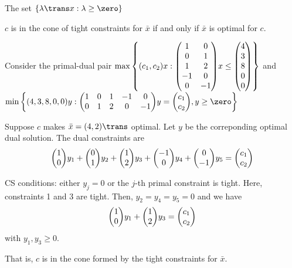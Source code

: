 \begin{defn*}
  The set $\{\lambda\trans x : \lambda \geq \zero\}$
\end{defn*}

\begin{lemma}
  $c$ is in the cone of tight constraints for $\bar x$
  if and only if $\bar x$ is optimal for $c$.
\end{lemma}


\begin{example}
  Consider the primal-dual pair
  $\max\qty{(c_1,c_2)x : \mqty(\imat{2}\\1&2\\-1&0\\0&-1)x \leq \mqty(4\\3\\8\\0\\0)}$
  and
  $\min\qty{(4,3,8,0,0)y : \mqty(1&0&1&-1&0\\0&1&2&0&-1)y = \mqty(c_1\\c_2), y \geq \zero}$
\end{example}
\begin{sol}
  Suppose $c$ makes $\bar x = (4,2)\trans$ optimal.
  Let $y$ be the correponding optimal dual solution.
  The dual constraints are
  \[ \mqty(1\\0)y_1 + \mqty(0\\1)y_2 + \mqty(1\\2)y_3 + \mqty(-1\\0)y_4 + \mqty(0\\-1)y_5 = \mqty(c_1\\c_2) \]

  CS conditions: either $y_j = 0$ or the $j$-th primal constraint
  is tight. Here, constraints 1 and 3 are tight.
  Then, $y_2 = y_4 = y_5 = 0$ and we have
  \[ \mqty(1\\0)y_1 + \mqty(1\\2)y_3 = \mqty(c_1\\c_2) \]
  with $y_1, y_3 \geq 0$.

  That is, $c$ is in the cone formed by the tight constraints for $\bar x$.
\end{sol}

